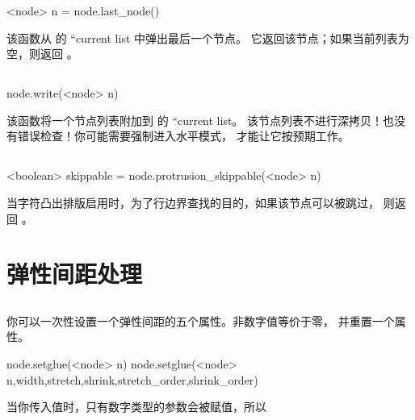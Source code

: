 
\begin{typing}
<node> n =
    node.last_node()
\end{typing}

该函数从 \TEX 的 ``current list 中弹出最后一个节点。
它返回该节点；如果当前列表为空，则返回 。

\subsection{}


\begin{typing}
node.write(<node> n)
\end{typing}

该函数将一个节点列表附加到 \TEX 的 ``current list。
该节点列表不进行深拷贝！也没有错误检查！你可能需要强制进入水平模式，
才能让它按预期工作。

\subsection{}


\begin{typing}
<boolean> skippable =
    node.protrusion_skippable(<node> n)
\end{typing}

当字符凸出排版启用时，为了行边界查找的目的，如果该节点可以被跳过，
则返回 。

\section{弹性间距处理}

\subsection{}


你可以一次性设置一个弹性间距的五个属性。非数字值等价于零，
并重置一个属性。

\begin{typing}
node.setglue(<node> n)
node.setglue(<node> n,width,stretch,shrink,stretch_order,shrink_order)
\end{typing}

当你传入值时，只有数字类型的参数会被赋值，所以

